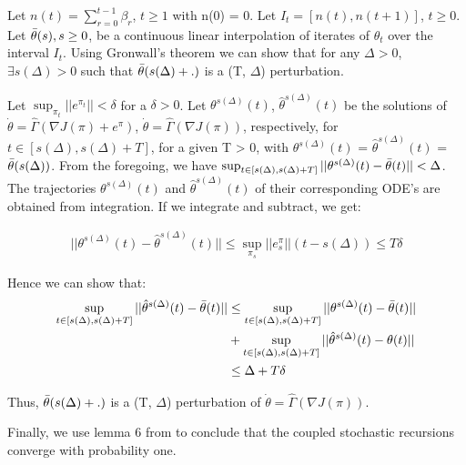 \documentclass[letterpaper]{article} %
\begin{document}
Let $n(t) = \sum_{r=0}^{t-1}\beta_{r}$, $t \geq 1$ with n(0) = 0. Let $I_{t} = [n(t), n(t+1)]$, $t \geq 0$. Let $\Bar{\theta}(s), s \geq 0$, be a continuous linear interpolation of iterates of $\theta_{t}$ over the interval $I_{t}$. Using Gronwall's theorem we can show that for any $\Delta>0$, $\exists s(\Delta)>0$ such that $\Bar{\theta}(s(\Delta)+.)$ is a (T, $\Delta$) perturbation.

Let $\sup_{\pi_{t}} || e^{\pi_{t}} || < \delta $ for a $\delta > 0$. Let $\theta^{s(\Delta)}(t)$, $\hat{\theta}^{s(\Delta)}(t)$ be the solutions of $\Dot{\theta}=\hat{\Gamma}(\nabla J(\pi) + e^{\pi})$, $\Dot{\theta}=\hat{\Gamma}(\nabla J(\pi)) $, respectively, for $t \in [s(\Delta),s(\Delta)+T]$, for a given T > 0, with $\theta^{s(\Delta)}(t)$ = $\hat{\theta}^{s(\Delta)}(t)$ = $\Bar{\theta}(s(\Delta))$. From the foregoing, we have $\sup_{t \in [s(\Delta),s(\Delta)+T]} || \theta^{s(\Delta)}(t) - \Bar{\theta}(t) ||< \Delta $. The trajectories $\theta^{s(\Delta)}(t)$ and $\hat{\theta}^{s(\Delta)}(t)$ of their corresponding ODE's are obtained from integration. If we integrate and subtract, we get:

\begin{equation}
\begin{split}
|| \theta^{s(\Delta)}(t) - \hat{\theta}^{s(\Delta)}(t) || \leq \sup_{\pi_{s}} ||e^{\pi}_{s}||(t-s(\Delta)) \leq T\delta
\end{split}
\end{equation}

Hence we can show that:
\begin{equation}
\begin{split}
\sup_{t \in [s(\Delta),s(\Delta)+T]} || \hat{\theta}^{s(\Delta)}(t) - \Bar{\theta}(t) || &\leq \sup_{t \in [s(\Delta),s(\Delta)+T]} || \theta^{s(\Delta)}(t) - \Bar{\theta}(t) || \\ &+ \sup_{t \in [s(\Delta),s(\Delta)+T]} || \hat{\theta}^{s(\Delta)}(t) - \theta(t) ||\\
&\leq \Delta + T\delta
\end{split}
\end{equation}

Thus, $\Bar{\theta}(s(\Delta)+.)$ is a (T, $\Delta$) perturbation of $\Dot{\theta}=\hat{\Gamma}(\nabla J(\pi)) $.

Finally, we use lemma 6 from \cite{bhatnagar2009natural} to conclude that the coupled stochastic recursions converge with probability one.
\end{document}
